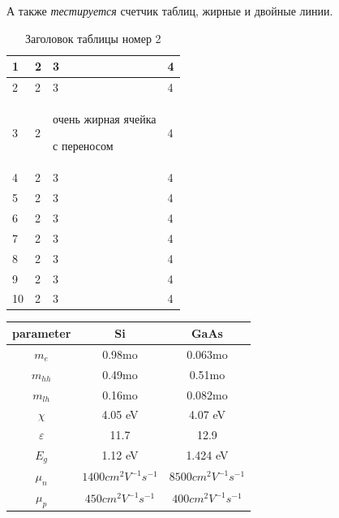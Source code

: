 \documentclass[a4paper,14pt]{extarticle}
\begin{document}
А также \textit{тестируется} счетчик таблиц, жирные и двойные линии.

\begin{center}
    \begin{longtable}{|p{2cm}||p{3cm}|p{7cm}|p{3cm}|}
        \caption{Заголовок таблицы номер 2}               \\
        \hline
        1  & 2 & 3                                    & 4 \\
        \hline
        2  & 2 & 3                                    & 4 \\
        \hline
        3  & 2 & очень жирная ячейка \par с переносом & 4 \\
        \hline
        4  & 2 & 3                                    & 4 \\
        \hline
        5  & 2 & 3                                    & 4 \\
        \hline
        6  & 2 & 3                                    & 4 \\
        \hline
        7  & 2 & 3                                    & 4 \\
        \hline
        8  & 2 & 3                                    & 4 \\
        \hline
        9  & 2 & 3                                    & 4 \\
        \hline
        10 & 2 & 3                                    & 4 \\
        \hline
    \end{longtable}
\end{center}


\begin{tabular}{|c|c|c|}
    \hline
    parameter     & Si                       & GaAs\tabularnewline
    \hline
    \hline
    $m_{e}$       & 0.98mo                   & 0.063mo\tabularnewline
    \hline
    $m_{hh}$      & 0.49mo                   & 0.51mo\tabularnewline
    \hline
    $m_{lh}$      & 0.16mo                   & 0.082mo\tabularnewline
    \hline
    $\chi$        & 4.05 eV                  & 4.07 eV\tabularnewline
    \hline
    $\varepsilon$ & 11.7                     & 12.9\tabularnewline
    \hline
    $E_{g}$       & 1.12 eV                  & 1.424 eV\tabularnewline
    \hline
    $\mu_{n}$     & $1400cm^{2}V^{-1}s^{-1}$ & $8500cm^{2}V^{-1}s^{-1}$\tabularnewline
    \hline
    $\mu_{p}$     & $450cm^{2}V^{-1}s^{-1}$  & $400cm^{2}V^{-1}s^{-1}$\tabularnewline
    \hline
\end{tabular}
\end{document}
